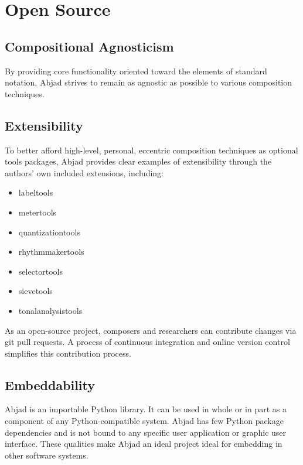 \section{Open Source}\label{sec:open_source}

\subsection{Compositional Agnosticism}

By providing core functionality oriented toward the elements of standard
notation, Abjad strives to remain as agnostic as possible to various
composition techniques. 

\subsection{Extensibility}

To better afford high-level, personal, eccentric composition techniques as
optional tools packages, Abjad provides clear examples of extensibility through
the authors' own included extensions, including: 

\begin{itemize}
    \item labeltools
    \item metertools
    \item quantizationtools
    \item rhythmmakertools
    \item selectortools
    \item sievetools
    \item tonalanalysistools
\end{itemize}


As an open-source project, composers and researchers can contribute changes via
git pull requests. A process of continuous integration and online version
control simplifies this contribution process. 

\subsection{Embeddability}

Abjad is an importable Python library. It can be used in whole or in part as a
component of any Python-compatible system. Abjad has few Python package
dependencies and is not bound to any specific user application or graphic user
interface. These qualities make Abjad an ideal project ideal for embedding in
other software systems.

